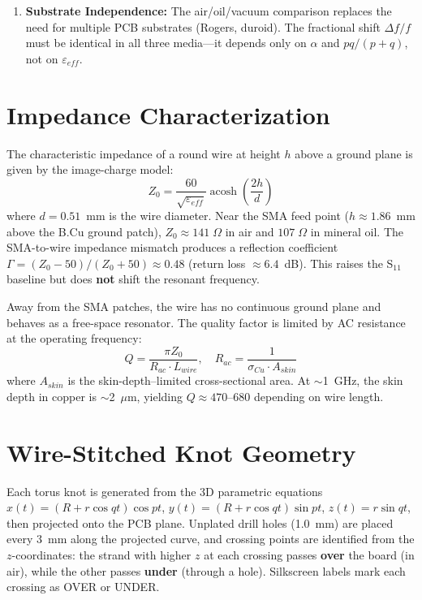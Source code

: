 \begin{enumerate}
    \item \textbf{Substrate Independence:} The air/oil/vacuum comparison replaces the need for multiple PCB substrates (Rogers, duroid). The fractional shift $\Delta f / f$ must be identical in all three media---it depends only on $\alpha$ and $pq/(p+q)$, not on $\varepsilon_{eff}$.
\end{enumerate}

\section{Impedance Characterization}

The characteristic impedance of a round wire at height $h$ above a ground plane is given by the image-charge model:
\begin{equation}
    Z_0 = \frac{60}{\sqrt{\varepsilon_{eff}}} \operatorname{acosh}\!\left(\frac{2h}{d}\right)
    \label{eq:z0_wire}
\end{equation}
where $d = 0.51$~mm is the wire diameter. Near the SMA feed point ($h \approx 1.86$~mm above the B.Cu ground patch), $Z_0 \approx 141\;\Omega$ in air and $107\;\Omega$ in mineral oil. The SMA-to-wire impedance mismatch produces a reflection coefficient $\Gamma = (Z_0 - 50)/(Z_0 + 50) \approx 0.48$ (return loss $\approx 6.4$~dB). This raises the S$_{11}$ baseline but does \textbf{not} shift the resonant frequency.

Away from the SMA patches, the wire has no continuous ground plane and behaves as a free-space resonator. The quality factor is limited by AC resistance at the operating frequency:
\begin{equation}
    Q = \frac{\pi Z_0}{R_{ac} \cdot L_{wire}}, \quad R_{ac} = \frac{1}{\sigma_{Cu} \cdot A_{skin}}
\end{equation}
where $A_{skin}$ is the skin-depth--limited cross-sectional area. At $\sim$1~GHz, the skin depth in copper is $\sim$2~$\mu$m, yielding $Q \approx 470$--$680$ depending on wire length.

\section{Wire-Stitched Knot Geometry}

Each torus knot is generated from the 3D parametric equations $x(t) = (R + r\cos qt)\cos pt$, $y(t) = (R + r\cos qt)\sin pt$, $z(t) = r\sin qt$, then projected onto the PCB plane. Unplated drill holes (1.0~mm) are placed every 3~mm along the projected curve, and crossing points are identified from the $z$-coordinates: the strand with higher $z$ at each crossing passes \textbf{over} the board (in air), while the other passes \textbf{under} (through a hole). Silkscreen labels mark each crossing as OVER or UNDER.


